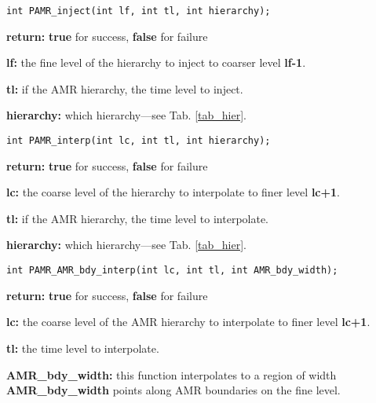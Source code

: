 \documentclass[aps,amssymb,unsortedaddress,nofootinbib]{revtex4}
\def\lsep{\itemsep 0.05in}
\begin{document}

\begin{verbatim}
int PAMR_inject(int lf, int tl, int hierarchy);
\end{verbatim}
\begin{list}{}{\lsep}
\item {\bf return:} {\bf true} for success, {\bf false} for failure
\item {\bf lf:} the fine level of the hierarchy to inject to coarser level {\bf lf-1}.
\item {\bf tl:} if the AMR hierarchy, the time level to inject.
\item {\bf hierarchy:} which hierarchy---see Tab. \ref{tab_hier}.
\end{list}


\begin{verbatim}
int PAMR_interp(int lc, int tl, int hierarchy);
\end{verbatim}
\begin{list}{}{\lsep}
\item {\bf return:}  {\bf true} for success, {\bf false} for failure
\item {\bf lc:} the coarse level of the hierarchy to interpolate to finer level {\bf lc+1}.
\item {\bf tl:} if the AMR hierarchy, the time level to interpolate.
\item {\bf hierarchy:} which hierarchy---see Tab. \ref{tab_hier}.
\end{list}


\begin{verbatim}
int PAMR_AMR_bdy_interp(int lc, int tl, int AMR_bdy_width);
\end{verbatim}
\begin{list}{}{\lsep}
\item {\bf return:} {\bf true} for success, {\bf false} for failure
\item {\bf lc:} the coarse level of the AMR hierarchy to interpolate to finer level {\bf lc+1}.
\item {\bf tl:} the time level to interpolate.
\item {\bf AMR\_bdy\_width:} this function interpolates to a region of width {\bf AMR\_bdy\_width}
                             points along AMR boundaries on the fine level.
\end{list}
\end{document}
